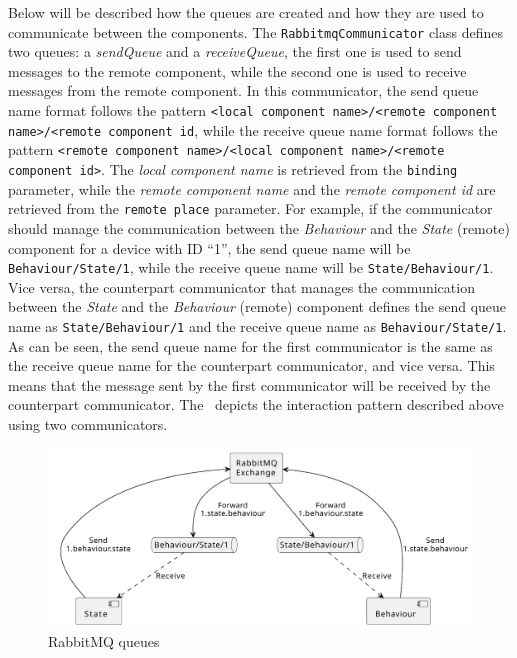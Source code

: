 Below will be described how the queues are created and how they are used to communicate between the components.
The \texttt{RabbitmqCommunicator} class defines two queues: a \emph{sendQueue} and a \emph{receiveQueue}, the first one is used to send messages to
the remote component, while the second one is used to receive messages from the remote component.
In this communicator, the send queue name format follows the pattern \texttt{<local component name>/<remote component name>/<remote component id},
while the receive queue name format follows the pattern \texttt{<remote component name>/<local component name>/<remote component id>}.
The \emph{local component name} is retrieved from the \texttt{binding} parameter, while the \emph{remote component name} and the
\emph{remote component id} are retrieved from the \texttt{remote place} parameter.
For example, if the communicator should manage the communication between the \emph{Behaviour} and the \emph{State} (remote) component for a device
with ID ``1'', the send queue name will be \texttt{Behaviour/State/1}, while the receive queue name will be \texttt{State/Behaviour/1}.
Vice versa, the counterpart communicator that manages the communication between the \emph{State} and the \emph{Behaviour} (remote) component
defines the send queue name as \texttt{State/Behaviour/1} and the receive queue name as \texttt{Behaviour/State/1}.
As can be seen, the send queue name for the first communicator is the same as the receive queue name for the counterpart communicator, and vice versa.
This means that the message sent by the first communicator will be received by the counterpart communicator.
The~ depicts the interaction pattern described above using two communicators.

\begin{figure}[ht]
	\centering
	\includegraphics[width=\textwidth]{figures/rabbitmq-queue.pdf}
	\caption{RabbitMQ queues}
	\label{fig:rabbitmq-queues}
\end{figure}

